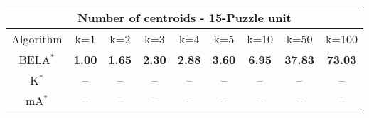 \begin{tabular}{c|cccccccc}\toprule
\multicolumn{9}{c}{Number of centroids - 15-Puzzle unit}\\ \midrule
Algorithm & k=1 & k=2 & k=3 & k=4 & k=5 & k=10 & k=50 & k=100 \\ \midrule
BELA$^*$ & \textbf{1.00} & \textbf{1.65} & \textbf{2.30} & \textbf{2.88} & \textbf{3.60} & \textbf{6.95} & \textbf{37.83} & \textbf{73.03} \\
K$^*$ & -- & -- & -- & -- & -- & -- & -- & -- \\
mA$^*$ & -- & -- & -- & -- & -- & -- & -- & -- \\ \bottomrule 
\end{tabular}
